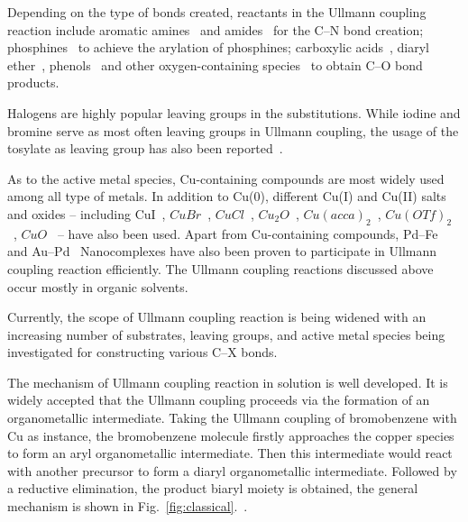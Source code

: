 \documentclass[%
 reprint,
 amsmath,amssymb,
 aps,
prb,
]{revtex4-1}
\begin{document}
Depending on the type of bonds created, reactants in the Ullmann coupling reaction include aromatic amines~\cite{ullmann_17,ullmann_18} and amides~\cite{ullmann_19,ullmann_20} for the C--N bond creation; phosphines~\cite{ullmann_21,ullmann_22} to achieve the arylation of phosphines; carboxylic acids~\cite{ullmann_23}, diaryl ether~\cite{ullmann_24}, phenols~\cite{ullmann_25} and other oxygen-containing species~\cite{ullmann_26,ullmann_27,ullmann_28} to obtain C--O bond products.

Halogens are highly popular leaving groups in the substitutions. While iodine and bromine serve as most often leaving groups in Ullmann coupling, the usage of the tosylate as leaving group has also been reported~\cite{ullmann_15}. 

As to the active metal species, Cu-containing compounds are most widely used among all type of metals. In addition to Cu(0), different Cu(I) and Cu(II) salts and oxides -- including CuI~\cite{ullmann_07,ullmann_08,ullmann_09}, $CuBr$~\cite{ullmann_10,ullmann_11}, $CuCl$~\cite{ullmann_13}, $Cu_2O$~\cite{ullmann_12}, $Cu(acca)_2$~\cite{ullmann_14}, $Cu(OTf)_2$~\cite{ullmann_15}, $CuO$~\cite{ullmann_16} -- have also been used. Apart from Cu-containing compounds, Pd–Fe~\cite{ullmann_35} and Au–Pd~\cite{ullmann_36} Nanocomplexes have also been proven to participate in Ullmann coupling reaction efficiently. The Ullmann coupling reactions discussed above occur mostly in organic solvents. 

Currently, the scope of Ullmann coupling reaction is being widened with an increasing number of substrates, leaving groups, and active metal species being investigated for constructing various C--X bonds. 


The mechanism of Ullmann coupling reaction in solution is well developed. It is widely accepted that the Ullmann coupling proceeds via the formation of an organometallic intermediate. Taking the Ullmann coupling of bromobenzene with Cu as instance, the bromobenzene molecule firstly approaches the copper species to form an aryl organometallic intermediate. Then this intermediate would react with another precursor to form a diaryl organometallic intermediate. Followed by a reductive elimination, the product biaryl moiety is obtained, the general mechanism is shown in Fig.~\ref{fig:classical}.~\cite{ullmann_37}.
\end{document}
